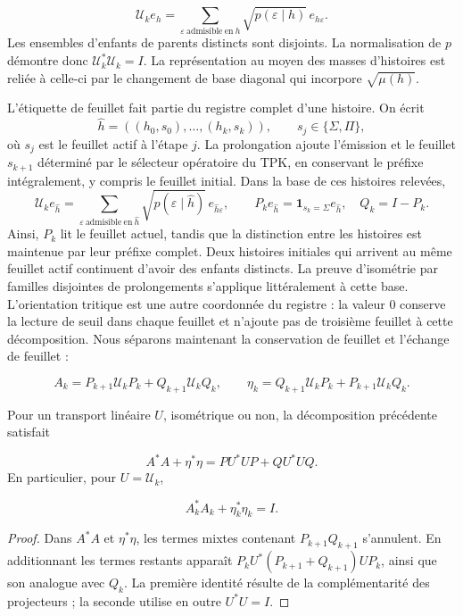 \[
\mathcal U_ke_h=
\sum_{\varepsilon\ \mathrm{admisible\ en}\ h}
\sqrt{p(\varepsilon\mid h)}\,e_{h\varepsilon}.
\]
Les ensembles d’enfants de parents distincts sont disjoints. La normalisation de \(p\) démontre donc \(\mathcal U_k^*\mathcal U_k=I\). La représentation au moyen des masses d’histoires est reliée à celle-ci par le changement de base diagonal qui incorpore \(\sqrt{\mu(h)}\).

L'étiquette de feuillet fait partie du registre complet d'une histoire. On écrit
\[
\widehat h=((h_0,s_0),\ldots,(h_k,s_k)),\qquad
s_j\in\{\Sigma,\Pi\},
\]
où \(s_j\) est le feuillet actif à l'étape \(j\). La prolongation ajoute l'émission et le feuillet \(s_{k+1}\) déterminé par le sélecteur opératoire du TPK, en conservant le préfixe intégralement, y compris le feuillet initial. Dans la base de ces histoires relevées,
\[
\mathcal U_ke_{\widehat h}
=\sum_{\varepsilon\ \mathrm{admisible\ en}\ \widehat h}
\sqrt{p(\varepsilon\mid\widehat h)}\,e_{\widehat h\varepsilon},
\qquad
P_ke_{\widehat h}=\mathbf1_{s_k=\Sigma}e_{\widehat h},\quad
Q_k=I-P_k.
\]
Ainsi, \(P_k\) lit le feuillet actuel, tandis que la distinction entre les histoires est maintenue par leur préfixe complet. Deux histoires initiales qui arrivent au même feuillet actif continuent d'avoir des enfants distincts. La preuve d'isométrie par familles disjointes de prolongements s'applique littéralement à cette base.
L'orientation tritique est une autre coordonnée du registre : la valeur \(0\) conserve la lecture de seuil dans chaque feuillet et n'ajoute pas de troisième feuillet à cette décomposition. Nous séparons maintenant la conservation de feuillet et l'échange de feuillet :

\[
A_k=P_{k+1}\mathcal U_kP_k+Q_{k+1}\mathcal U_kQ_k,
\qquad
\eta_k=Q_{k+1}\mathcal U_kP_k+P_{k+1}\mathcal U_kQ_k.
\]
\begin{proposition}
\label{x_reciprocidad:iv:cont:gram}
Pour un transport linéaire \(U\), isométrique ou non, la décomposition précédente satisfait

\[
A^*A+\eta^*\eta=PU^*UP+QU^*UQ.
\]
En particulier, pour \(U=\mathcal U_k\),

\[
A_k^*A_k+\eta_k^*\eta_k=I.
\]
\end{proposition}
\begin{proof}
Dans \(A^*A\) et \(\eta^*\eta\), les termes mixtes contenant \(P_{k+1}Q_{k+1}\) s'annulent. En additionnant les termes restants apparaît \(P_kU^*(P_{k+1}+Q_{k+1})UP_k\), ainsi que son analogue avec \(Q_k\). La première identité résulte de la complémentarité des projecteurs ; la seconde utilise en outre \(U^*U=I\).
\end{proof}

